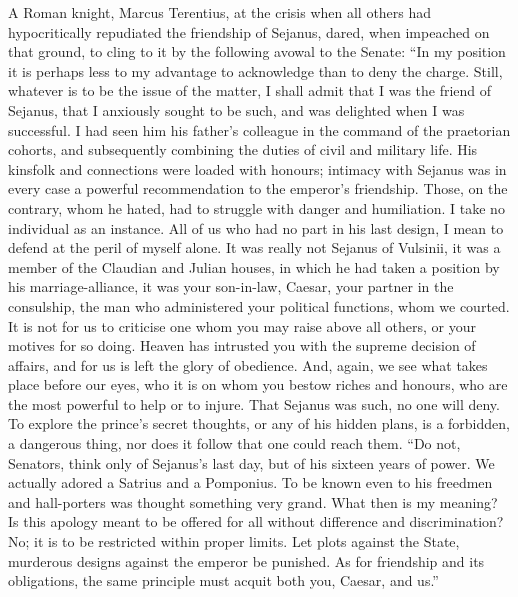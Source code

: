 A Roman knight, Marcus Terentius, at the crisis when all others had hypocritically repudiated the friendship of Sejanus, dared, when impeached on that ground, to cling to it by the following avowal to the Senate: ``In my position it is perhaps less to my advantage to acknowledge than to deny the charge. Still, whatever is to be the issue of the matter, I shall admit that I was the friend of Sejanus, that I anxiously sought to be such, and was delighted when I was successful. I had seen him his father's colleague in the command of the praetorian cohorts, and subsequently combining the duties of civil and military life. His kinsfolk and connections were loaded with honours; intimacy with Sejanus was in every case a powerful recommendation to the emperor's friendship. Those, on the contrary, whom he hated, had to struggle with danger and humiliation. I take no individual as an instance. All of us who had no part in his last design, I mean to defend at the peril of myself alone. It was really not Sejanus of Vulsinii, it was a member of the Claudian and Julian houses, in which he had taken a position by his marriage-alliance, it was your son-in-law, Caesar, your partner in the consulship, the man who administered your political functions, whom we courted. It is not for us to criticise one whom you may raise above all others, or your motives for so doing. Heaven has intrusted you with the supreme decision of affairs, and for us is left the glory of obedience. And, again, we see what takes place before our eyes, who it is on whom you bestow riches and honours, who are the most powerful to help or to injure. That Sejanus was such, no one will deny. To explore the prince's secret thoughts, or any of his hidden plans, is a forbidden, a dangerous thing, nor does it follow that one could reach them. ``Do not, Senators, think only of Sejanus's last day, but of his sixteen years of power. We actually adored a Satrius and a Pomponius. To be known even to his freedmen and hall-porters was thought something very grand. What then is my meaning? Is this apology meant to be offered for all without difference and discrimination? No; it is to be restricted within proper limits. Let plots against the State, murderous designs against the emperor be punished. As for friendship and its obligations, the same principle must acquit both you, Caesar, and us.''


